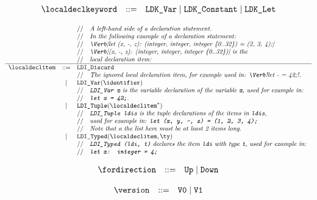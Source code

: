 \documentclass{book}
\begin{document}
\[
\begin{array}{rcl}
\localdeclkeyword &::=& \texttt{LDK\_Var} \;|\; \texttt{LDK\_Constant} \;|\; \texttt{LDK\_Let}\\
\end{array}
\]

\[
\begin{array}{rcl}
  & & \ASTComment{A left-hand side of a declaration statement.}\\
  & & \ASTComment{In the following example of a declaration statement:}\\
  & & \ASTComment{\Verb|let (x, -, z): (integer, integer, integer \{0..32\}) = (2, 3, 4);|}\\
  & & \ASTComment{\Verb|(x, -, z): (integer, integer, integer \{0..32\})| is the}\\
  & & \ASTComment{local declaration item:}\\
  \hline
\localdeclitem &::=
    & \texttt{LDI\_Discard}\\
  & & \ASTComment{The ignored local declaration item, for example used in: \Verb!let - = 42;!.}\\
  &|& \texttt{LDI\_Var}(\identifier)\\
  & & \ASTComment{\texttt{LDI\_Var x} is the variable declaration of the variable \texttt{x}, used for example in:}\\
  & & \ASTComment{\texttt{let x = 42;}.}\\
  &|& \texttt{LDI\_Tuple}(\localdeclitem^*)\\
  & & \ASTComment{\texttt{LDI\_Tuple ldis} is the tuple declarations of the items in \texttt{ldis},}\\
  & & \ASTComment{used for example in: \texttt{let (x, y, -, z) = (1, 2, 3, 4);}}\\
  & & \ASTComment{Note that a the list here must be at least 2 items long.}\\
  &|& \texttt{LDI\_Typed}(\localdeclitem, \ty)\\
  & & \ASTComment{\texttt{LDI\_Typed (ldi, t)} declares the item \texttt{ldi} with type \texttt{t}, used for example in:} \\
  & & \ASTComment{\texttt{let x: integer = 4;}}
\end{array}
\]

\[
\begin{array}{rcl}
\fordirection &::=& \texttt{Up} \;|\; \texttt{Down}\\
\end{array}
\]

\[
\begin{array}{rcl}
\version &::=& \texttt{V0} \;|\; \texttt{V1}\\
\end{array}
\]
\end{document}
